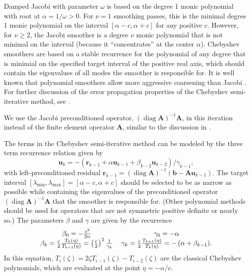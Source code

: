 \documentclass[review]{siamart190516}
\DeclareMathOperator{\diag}{diag}
\begin{document}
Damped Jacobi with parameter $\omega$ is based on the degree 1 monic polynomial with root at $\alpha = 1/\omega > 0$.
For $\nu=1$ smoothing passes, this is the minimal degree 1 monic polynomial on the interval $[\alpha-c, \alpha+c]$ for any positive $c$.
However, for $\nu \ge 2$, the Jacobi smoother is a degree $\nu$ monic polynomial that is not minimal on the interval (because it ``concentrates'' at the center $\alpha$).
Chebyshev smoothers are based on a stable recurrence for the polynomial of any degree that is minimial on the specified target interval of the positive real axis, which should contain the eigenvalues of all modes the smoother is responsible for.
It is well known that polynomial smoothers allow more aggressive coarsening than Jacobi \cite{brannick2015polynomial}.
For further discussion of the error propagation properties of the Chebyshev semi-iterative method, see \cite{gutknecht2002revisited}.

We use the Jacobi preconditioned operator, $\left( \diag {\mathbf{A}} \right)^{-1} {\mathbf{A}}$, in this iteration instead of the finite element operator ${\mathbf{A}}$, similar to the discussion in \cite{adams2003parallel}.

The terms in the Chebyshev semi-iterative method can be modeled by the three term recurrence relation given by
\begin{equation}
\mathbf{u}_k = - \left( \mathbf{r}_{k - 1} + \alpha \mathbf{u}_{k - 1} + \beta_{k - 2} \mathbf{u}_{k - 2} \right) / \gamma_{k - 1},
\label{eq:chebyshev_recursive}
\end{equation}
with left-preconditioned residual $\mathbf r_{k-1} = \left( \diag {\mathbf{A}} \right)^{-1} \left( \mathbf b - \mathbf A \mathbf u_{k-1} \right)$.
The target interval $[\lambda_{\min}, \lambda_{\max}] = [\alpha - c, \alpha + c]$ should be selected to be as narrow as possible while containing the eigenvalues of the preconditioned operator $\left( \diag {\mathbf{A}} \right)^{-1} \mathbf A$ that the smoother is responsible for.
(Other polynomial methods should be used for operators that are not symmetric positive definite or nearly so.)
The parameters $\beta$ and $\gamma$ are given by the recurrence
\begin{equation}
\begin{tabular}{c c}
$\beta_0 = - \frac{c^2}{2 \alpha}$ & $\gamma_0 = - \alpha$\\
$\beta_k = \frac{c}{2} \frac{T_k \left( \eta \right)}{T_{k + 1} \left( \eta \right)} = \left( \frac{c}{2} \right)^2 \frac{1}{\gamma_k}$ & $\gamma_k = \frac{c}{2} \frac{T_{k + 1} \left( \eta \right)}{T_k \left( \eta \right)} = - \left( \alpha + \beta_{k - 1} \right)$.
\end{tabular}
\end{equation}
In this equation, $T_i \left( \zeta \right) = 2 \zeta T_{i - 1} \left( \zeta \right) - T_{i - 2} \left( \zeta \right)$ are the classical Chebyshev polynomials, which are evaluated at the point $\eta = - \alpha / c$.
\end{document}
